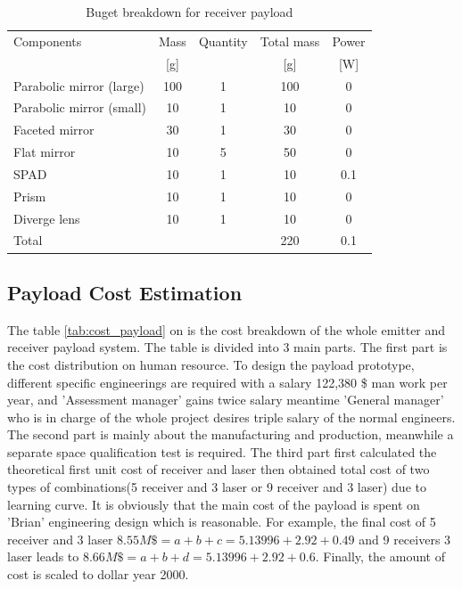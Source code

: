 \begin{table}[ht!]
\centering
\begin{tabular}{l | c | c | c | c }
Components                & Mass  & Quantity & Total mass & Power\\ 
                          &  [g]  &          &     [g]    &  [W] \\\hline\hline
Parabolic mirror (large)  &  100  &     1    &     100    &   0   \\
Parabolic mirror (small)  &  10   &     1    &     10     &   0   \\
Faceted mirror            &  30   &     1    &     30     &   0   \\ 
Flat mirror               &  10   &     5    &     50     &   0   \\
\acs{SPAD}                &  10   &     1    &     10     &   0.1 \\
Prism                     &  10   &     1    &     10     &   0   \\ 
Diverge lens              &  10   &     1    &     10     &   0   \\ \hline
Total                     &       &          &     220    &   0.1 \\
\end{tabular}
\caption{Buget breakdown for receiver payload}
\label{tab:receiverbudget}
\end{table}


\subsection{Payload Cost Estimation}
\label{cost}
The table \ref{tab:cost_payload} on \pageref{tab:cost_payload} is the cost breakdown of the whole emitter and receiver payload system. The table is divided into 3 main parts. The first part is the cost distribution on human resource. To design the payload prototype, different specific engineerings are required with a salary 122,380 \$ man work per year\cite{engineering_salary}, and 'Assessment manager' gains twice salary meantime 'General manager' who is in charge of the whole project desires triple salary of the normal engineers. The second part is mainly about the manufacturing and production, meanwhile a separate space qualification test is required. The third part first calculated the theoretical first unit cost of receiver and \acs{laser} then obtained total cost of two types of combinations(5 receiver and 3 \acs{laser} or 9 receiver and 3 \acs{laser}) due to learning curve\cite{Space2B}. It is obviously that the main cost of the payload is spent on 'Brian' engineering design which is reasonable. For example, the final cost of 5 receiver and 3 \acs{laser} $8.55 M\$ = a + b + c = 5.13996 + 2.92 + 0.49$ and 9 receivers 3 \acs{laser} leads to $8.66 M\$ = a + b + d = 5.13996 + 2.92 + 0.6$. Finally, the amount of cost is scaled to dollar year 2000.

